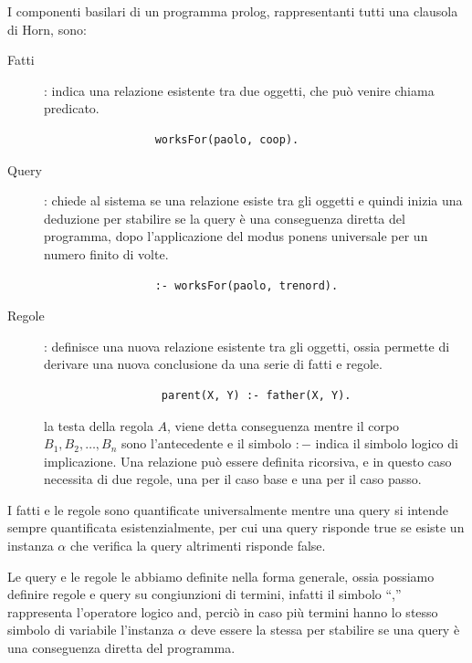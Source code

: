 \documentclass[a4paper]{report}
\begin{document}
I componenti basilari di un programma prolog, rappresentanti tutti una clausola di Horn, sono:
\begin{description}
\item [Fatti]: indica una relazione esistente tra due oggetti, che può venire chiama predicato.
               \begin{verbatim}
                 worksFor(paolo, coop).
               \end{verbatim}
\item [Query]: chiede al sistema se una relazione esiste tra gli oggetti e quindi inizia una deduzione per stabilire se la query
               è una conseguenza diretta del programma, dopo l'applicazione del modus ponens universale per un numero finito di volte.
               \begin{verbatim}
                 :- worksFor(paolo, trenord).
               \end{verbatim}
 
\item [Regole]: definisce una nuova relazione esistente tra gli oggetti, ossia permette di derivare una nuova conclusione
                da una serie di fatti e regole.
                \begin{verbatim}
                  parent(X, Y) :- father(X, Y).
                \end{verbatim}
                la testa della regola $A$, viene detta conseguenza mentre il corpo $B_1, B_2, \dots, B_n$ sono l'antecedente
                e il simbolo $:-$ indica il simbolo logico di implicazione.\newline
                Una relazione può essere definita ricorsiva, e in questo caso necessita di due regole, una per il caso base e
                una per il caso passo.
                
\end{description}
I fatti e le regole sono quantificate universalmente mentre una query si intende sempre quantificata esistenzialmente, per cui una query
risponde true se esiste un instanza $\alpha$ che verifica la query altrimenti risponde false.

Le query e le regole le abbiamo definite nella forma generale, ossia possiamo definire regole e query su congiunzioni di termini,
infatti il simbolo ``,'' rappresenta l'operatore logico and, perciò in caso più termini hanno lo stesso simbolo di variabile
l'instanza $\alpha$ deve essere la stessa per stabilire se una query è una conseguenza diretta del programma.
\end{document}
